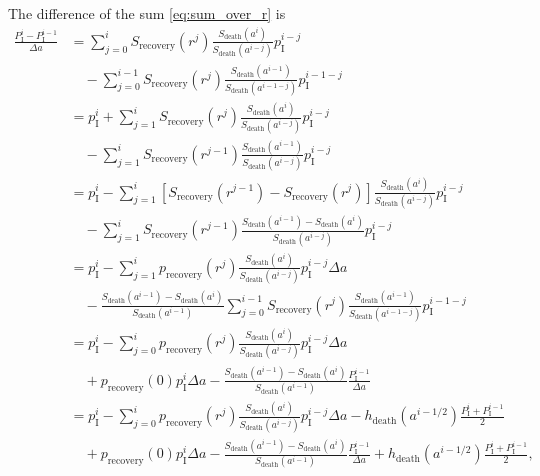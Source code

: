 \documentclass[12pt]{article}
\begin{document}
The difference of the sum \eqref{eq:sum_over_r} is
\begin{equation}
  \label{eq:sum_difference}
  \begin{split}
    \frac{P_{\mathrm{I}}^i - P_{\mathrm{I}}^{i - 1}}{\Delta a}
    &=
    \sum_{j = 0}^i S_{\text{recovery}}(r^j)
    \frac{S_{\text{death}}(a^i)}{S_{\text{death}}(a^{i - j})}
    p_{\mathrm{I}}^{i - j}
    \\ & \quad {}
    - \sum_{j = 0}^{i - 1} S_{\text{recovery}}(r^j)
    \frac{S_{\text{death}}(a^{i - 1})}{S_{\text{death}}(a^{i - 1 - j})}
    p_{\mathrm{I}}^{i - 1 - j}
    \\
    &= p_{\mathrm{I}}^i
    + \sum_{j = 1}^i S_{\text{recovery}}(r^j)
    \frac{S_{\text{death}}(a^i)}{S_{\text{death}}(a^{i - j})}
    p_{\mathrm{I}}^{i - j}
    \\ & \quad {}
    - \sum_{j = 1}^i S_{\text{recovery}}(r^{j - 1})
    \frac{S_{\text{death}}(a^{i - 1})}{S_{\text{death}}(a^{i - j})}
    p_{\mathrm{I}}^{i - j}
    \\
    &= p_{\mathrm{I}}^i
    - \sum_{j = 1}^i
    \left[
      S_{\text{recovery}}(r^{j - 1})
      - S_{\text{recovery}}(r^j)
    \right]
    \frac{S_{\text{death}}(a^i)}{S_{\text{death}}(a^{i - j})}
    p_{\mathrm{I}}^{i - j}
    \\ & \quad {}
    - \sum_{j = 1}^i S_{\text{recovery}}(r^{j - 1})
    \frac{S_{\text{death}}(a^{i - 1}) - S_{\text{death}}(a^i)}
    {S_{\text{death}}(a^{i - j})}
    p_{\mathrm{I}}^{i - j}
    \\
    &= p_{\mathrm{I}}^i
    - \sum_{j = 1}^i p_{\text{recovery}}(r^j)
    \frac{S_{\text{death}}(a^i)}{S_{\text{death}}(a^{i - j})}
    p_{\mathrm{I}}^{i - j} \Delta a
    \\ & \quad {}
    - \frac{S_{\text{death}}(a^{i - 1}) - S_{\text{death}}(a^i)}
    {S_{\text{death}}(a^{i - 1})}
    \sum_{j = 0}^{i - 1} S_{\text{recovery}}(r^j)
    \frac{S_{\text{death}}(a^{i - 1})}{S_{\text{death}}(a^{i - 1 - j})}
    p_{\mathrm{I}}^{i - 1 - j}
    \\
    &= p_{\mathrm{I}}^i
    - \sum_{j = 0}^i p_{\text{recovery}}(r^j)
    \frac{S_{\text{death}}(a^i)}{S_{\text{death}}(a^{i - j})}
    p_{\mathrm{I}}^{i - j} \Delta a
    \\ & \quad {}
    + p_{\text{recovery}}(0) p_{\mathrm{I}}^i \Delta a
    - \frac{S_{\text{death}}(a^{i - 1}) - S_{\text{death}}(a^i)}
    {S_{\text{death}}(a^{i - 1})}
    \frac{P_{\mathrm{I}}^{i - 1}}{\Delta a}
    \\
    &= p_{\mathrm{I}}^i
    - \sum_{j = 0}^i p_{\text{recovery}}(r^j)
    \frac{S_{\text{death}}(a^i)}{S_{\text{death}}(a^{i - j})}
    p_{\mathrm{I}}^{i - j} \Delta a
    - h_{\text{death}}(a^{i - 1 / 2})
    \frac{P_{\mathrm{I}}^i + P_{\mathrm{I}}^{i - 1}}{2}
    \\ & \quad {}
    + p_{\text{recovery}}(0) p_{\mathrm{I}}^i \Delta a
    - \frac{S_{\text{death}}(a^{i - 1}) - S_{\text{death}}(a^i)}
    {S_{\text{death}}(a^{i - 1})}
    \frac{P_{\mathrm{I}}^{i - 1}}{\Delta a}
    + h_{\text{death}}(a^{i - 1 / 2})
    \frac{P_{\mathrm{I}}^i + P_{\mathrm{I}}^{i - 1}}{2},
  \end{split}
\end{equation}
\end{document}
